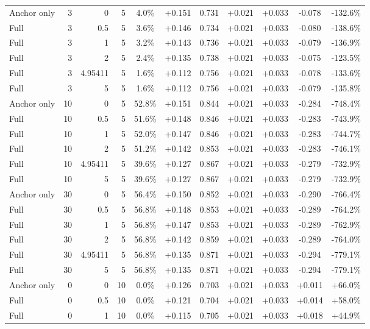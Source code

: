 \begin{table}[htbp]
\begin{tabular}{lrrrccccccc}
Anchor only & 3 & 0 & 5 & 4.0\% & +0.151 & 0.731 & +0.021 & +0.033 & -0.078 & -132.6\% \\
Full & 3 & 0.5 & 5 & 3.6\% & +0.146 & 0.734 & +0.021 & +0.033 & -0.080 & -138.6\% \\
Full & 3 & 1 & 5 & 3.2\% & +0.143 & 0.736 & +0.021 & +0.033 & -0.079 & -136.9\% \\
Full & 3 & 2 & 5 & 2.4\% & +0.135 & 0.738 & +0.021 & +0.033 & -0.075 & -123.5\% \\
Full & 3 & 4.95411 & 5 & 1.6\% & +0.112 & 0.756 & +0.021 & +0.033 & -0.078 & -133.6\% \\
Full & 3 & 5 & 5 & 1.6\% & +0.112 & 0.756 & +0.021 & +0.033 & -0.079 & -135.8\% \\
Anchor only & 10 & 0 & 5 & 52.8\% & +0.151 & 0.844 & +0.021 & +0.033 & -0.284 & -748.4\% \\
Full & 10 & 0.5 & 5 & 51.6\% & +0.148 & 0.846 & +0.021 & +0.033 & -0.283 & -743.9\% \\
Full & 10 & 1 & 5 & 52.0\% & +0.147 & 0.846 & +0.021 & +0.033 & -0.283 & -744.7\% \\
Full & 10 & 2 & 5 & 51.2\% & +0.142 & 0.853 & +0.021 & +0.033 & -0.283 & -746.1\% \\
Full & 10 & 4.95411 & 5 & 39.6\% & +0.127 & 0.867 & +0.021 & +0.033 & -0.279 & -732.9\% \\
Full & 10 & 5 & 5 & 39.6\% & +0.127 & 0.867 & +0.021 & +0.033 & -0.279 & -732.9\% \\
Anchor only & 30 & 0 & 5 & 56.4\% & +0.150 & 0.852 & +0.021 & +0.033 & -0.290 & -766.4\% \\
Full & 30 & 0.5 & 5 & 56.8\% & +0.148 & 0.853 & +0.021 & +0.033 & -0.289 & -764.2\% \\
Full & 30 & 1 & 5 & 56.8\% & +0.147 & 0.853 & +0.021 & +0.033 & -0.289 & -762.9\% \\
Full & 30 & 2 & 5 & 56.8\% & +0.142 & 0.859 & +0.021 & +0.033 & -0.289 & -764.0\% \\
Full & 30 & 4.95411 & 5 & 56.8\% & +0.135 & 0.871 & +0.021 & +0.033 & -0.294 & -779.1\% \\
Full & 30 & 5 & 5 & 56.8\% & +0.135 & 0.871 & +0.021 & +0.033 & -0.294 & -779.1\% \\
Anchor only & 0 & 0 & 10 & 0.0\% & +0.126 & 0.703 & +0.021 & +0.033 & +0.011 & +66.0\% \\
Full & 0 & 0.5 & 10 & 0.0\% & +0.121 & 0.704 & +0.021 & +0.033 & +0.014 & +58.0\% \\
Full & 0 & 1 & 10 & 0.0\% & +0.115 & 0.705 & +0.021 & +0.033 & +0.018 & +44.9\% \\

\end{tabular}
\end{table}

